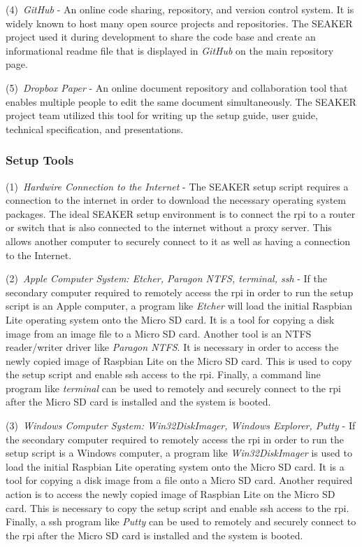 \documentclass[12pt]{article}
\begin{document}
(4)~{\em GitHub} - An online code sharing, repository, and version control
system.  It is widely known to host many open source projects and repositories.
The SEAKER project used it during development to share the code base and
create an informational readme file that is displayed in {\em GitHub} on
the main repository page.

(5)~{\em Dropbox Paper} - An online document repository and collaboration
tool that enables multiple people to edit the same document simultaneously.
The SEAKER project team utilized this tool for writing up the setup guide, 
user guide, technical specification, and presentations.

\subsubsection{Setup Tools}

(1)~{\em Hardwire Connection to the Internet} - The SEAKER setup script
requires a connection to the internet in order to download the necessary
operating system packages.  The ideal SEAKER setup environment is to 
connect the \gls{rpi} to a router or switch that is also connected to 
the internet without a proxy server.  This allows another computer to
securely connect to it as well as having a connection to the Internet.

(2)~{\em Apple Computer System: Etcher, Paragon NTFS, terminal, \gls{ssh}} - If the
secondary computer required to remotely access the \gls{rpi} in order to run the
setup script is an Apple computer, a program like {\em Etcher} will load
the initial Raspbian Lite operating system onto the Micro SD card.  It is a
tool for copying a disk image from an image file to a 
Micro SD card.  Another tool is an NTFS reader/writer driver like {\em Paragon
NTFS}.  It is necessary in order to access the newly copied image of Raspbian Lite
on the Micro SD card.
This is used to copy the setup script and enable \gls{ssh} access to the \gls{rpi}.
Finally, a command line program like {\em terminal} can be used to remotely and
securely connect to the \gls{rpi} after the Micro SD card is installed and the 
system is booted.

(3)~{\em Windows Computer System: Win32DiskImager, Windows Explorer, Putty} - 
If the secondary computer required to remotely access the \gls{rpi} in order to run the
setup script is a Windows computer, a program like {\em Win32DiskImager} is used to load
the initial Raspbian Lite operating system onto the Micro SD card.  It is a tool
for copying a disk image from a file onto a Micro SD card.
Another required action is to access the newly copied image of
Raspbian Lite on the Micro SD card. This is necessary to copy the setup script
and enable \gls{ssh} access to the \gls{rpi}.
Finally, a \gls{ssh} program like {\em Putty} can be used to remotely and
securely connect to the \gls{rpi} after the Micro SD card is installed and the 
system is booted.
\end{document}
